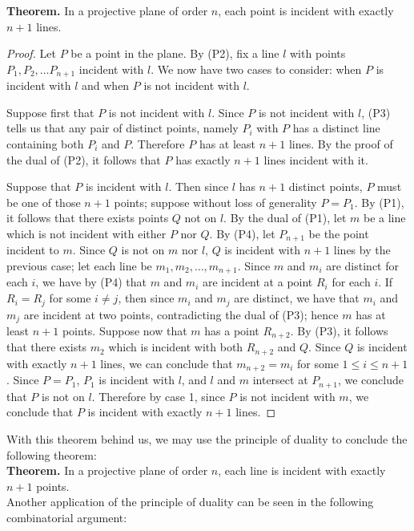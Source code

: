 \documentclass[12pt]{book}
\def\header #1{\noindent\textbf{#1}}
\begin{document}
\header{Theorem.} In a projective plane of order $n$, each point is incident with exactly $n+1$ lines.
\begin{proof}
Let $P$ be a point in the plane. By (P2), fix a line $l$ with points $P_1,P_2,\ldots P_{n+1}$ incident with $l$. We now have two cases to consider: when $P$ is incident with $l$ and when $P$ is not incident with $l$. 

Suppose first that $P$ is not incident with $l$. Since $P$ is not incident with $l$, (P3) tells us that any pair of distinct points, namely $P_i$ with $P$ has a distinct line containing both $P_i$ and $P$. Therefore $P$ has at least $n+1$ lines. By the proof of the dual of (P2), it follows that $P$ has exactly $n+1$ lines incident with it.

Suppose that $P$ is incident with $l$. Then since $l$ has $n+1$ distinct points, $P$ must be one of those $n+1$ points; suppose without loss of generality $P=P_1$. By (P1), it follows that there exists points $Q$ not on $l$. By the dual of (P1), let $m$ be a line which is not incident with either $P$ nor $Q$. By (P4), let $P_{n+1}$ be the point incident to $m$. Since $Q$ is not on $m$ nor $l$, $Q$ is incident with $n+1$ lines by the previous case; let each line be $m_1,m_2,\ldots,m_{n+1}$. Since $m$ and $m_i$ are distinct for each $i$, we have by (P4) that $m$ and $m_i$ are incident at a point $R_i$ for each $i$. If $R_i=R_j$ for some $i\neq j$, then since $m_i$ and $m_j$ are distinct, we have that $m_i$ and $m_j$ are incident at two points, contradicting the dual of (P3); hence $m$ has at least $n+1$ points. Suppose now that $m$ has a point $R_{n+2}$. By (P3), it follows that there exists $m_2$ which is incident with both $R_{n+2}$ and $Q$. Since $Q$ is incident with exactly $n+1$ lines, we can conclude that $m_{n+2}=m_i$ for some $1\leq i\leq n+1$. Since $P=P_1$, $P_1$ is incident with $l$, and $l$ and $m$ intersect at $P_{n+1}$, we conclude that $P$ is not on $l$. Therefore by case 1, since $P$ is not incident with $m$, we conclude that $P$ is incident with exactly $n+1$ lines.
\end{proof}

With this theorem behind us, we may use the principle of duality to conclude the following theorem:\\

\header{Theorem.} In a projective plane of order $n$, each line is incident with exactly $n+1$ points.\\

Another application of the principle of duality can be seen in the following combinatorial argument:\\
\end{document}
